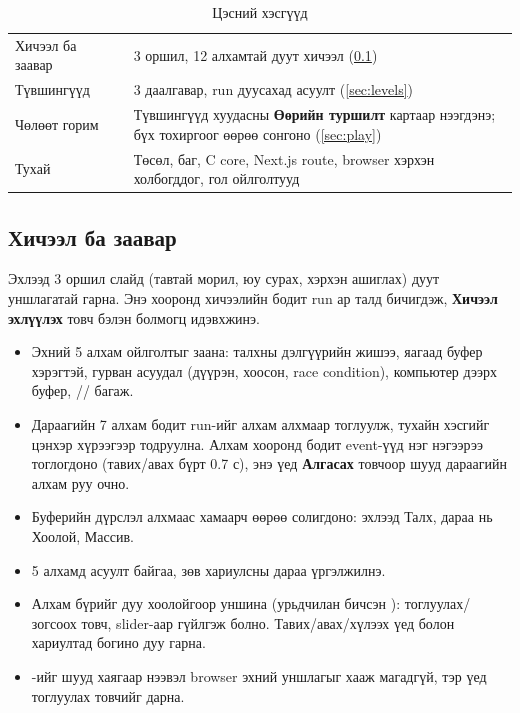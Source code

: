 \documentclass[12pt,a4paper]{article}
\begin{document}
\begin{table}[H]\centering\small
\caption{Цэсний хэсгүүд}\label{tab:menu}
\begin{tabular}{|L{0.22\textwidth}|L{0.14\textwidth}|L{0.64\textwidth}|}\hline
{} &  &  \\\hline
Хичээл ба заавар &  & 3 оршил, 12 алхамтай дуут хичээл (\ref{sec:learn}) \\\hline
Түвшингүүд &  & 3 даалгавар, run дуусахад асуулт (\ref{sec:levels}) \\\hline
Чөлөөт горим &  & Түвшингүүд хуудасны \textbf{Өөрийн туршилт} картаар нээгдэнэ; бүх тохиргоог өөрөө сонгоно (\ref{sec:play}) \\\hline
Тухай &  & Төсөл, баг, C core, Next.js route, browser хэрхэн холбогддог, гол ойлголтууд \\\hline
\end{tabular}
\end{table}


\subsection{Хичээл ба заавар}\label{sec:learn}
Эхлээд 3 оршил слайд (тавтай морил, юу сурах, хэрхэн ашиглах) дуут уншлагатай гарна. Энэ хооронд хичээлийн бодит run ар талд бичигдэж, \textbf{Хичээл эхлүүлэх} товч бэлэн болмогц идэвхжинэ.
\begin{itemize}
  \item Эхний 5 алхам ойлголтыг заана: талхны дэлгүүрийн жишээ, яагаад буфер хэрэгтэй, гурван асуудал (дүүрэн, хоосон, race condition), компьютер дээрх буфер, // багаж.
  \item Дараагийн 7 алхам бодит run-ийг алхам алхмаар тоглуулж, тухайн хэсгийг цэнхэр хүрээгээр тодруулна. Алхам хооронд бодит event-үүд нэг нэгээрээ тоглогдоно (тавих/авах бүрт 0.7 с), энэ үед \textbf{Алгасах} товчоор шууд дараагийн алхам руу очно.
  \item Буферийн дүрслэл алхмаас хамаарч өөрөө солигдоно: эхлээд Талх, дараа нь Хоолой, Массив.
  \item 5 алхамд асуулт байгаа, зөв хариулсны дараа үргэлжилнэ.
  \item Алхам бүрийг дуу хоолойгоор уншина (урьдчилан бичсэн ): тоглуулах/зогсоох товч, slider-аар гүйлгэж болно. Тавих/авах/хүлээх үед болон хариултад богино дуу гарна.
  \item {}-ийг шууд хаягаар нээвэл browser эхний уншлагыг хааж магадгүй, тэр үед тоглуулах товчийг дарна.
\end{itemize}
\end{document}
